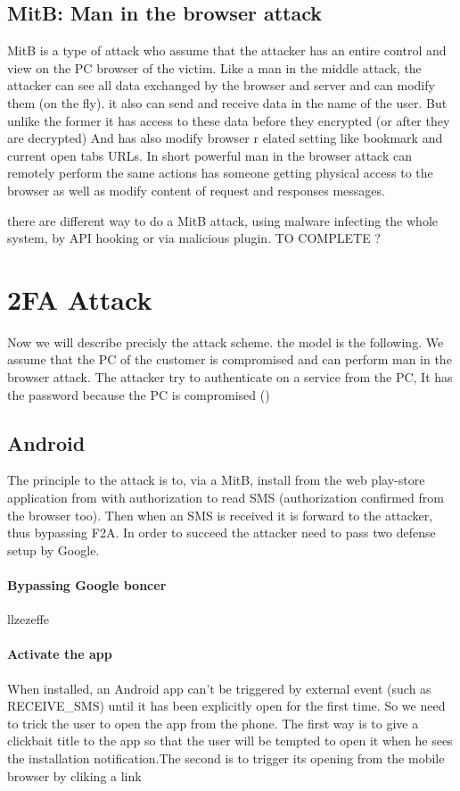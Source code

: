 \documentclass[11pt, a4paper,twocolumn]{article}
\begin{document}
\subsection{MitB: Man in the browser attack}
MitB is a type of attack who assume that the attacker has an entire control and view on the PC browser of the victim. Like a man in the middle attack, the attacker can see all data 
exchanged by the browser and server and can modify them (on the fly). it also can send and receive data in the name of the user. But unlike the former it has access to these data before they encrypted (or after they are decrypted) And has also modify browser r elated setting like bookmark and current open tabs URLs. In short powerful man in the browser attack can remotely perform the same actions has someone getting physical access to the browser as well as modify content of request and responses messages.

there are different way to do a MitB attack, using malware infecting the whole system, by API hooking or via malicious plugin. TO COMPLETE ?
\section{2FA Attack}
Now we will describe precisly the attack scheme. the model is the following. We assume that the PC of the customer is compromised and can perform man in the browser attack. The attacker try to authenticate on a service from the PC, It has the password because the PC is compromised () 
\subsection{Android}
The principle to the attack is to, via a MitB, install from the web play-store application from with authorization to read SMS (authorization confirmed from the browser 
too). Then when an SMS is received it is forward to the attacker, thus bypassing 
F2A. In order to succeed the attacker need to pass two defense setup by Google.

\paragraph{Bypassing Google boncer} llzezeffe

\paragraph{Activate the app} When installed, an Android app can't be triggered by external event (such as RECEIVE\_SMS) until it has been explicitly open for the first time. So we need to trick the user to open the app from the phone. The 
first way is to give a clickbait title to the app so that the user will be tempted to open it when he sees the installation notification.The second is to trigger its opening from the mobile browser by cliking a link
\end{document}
